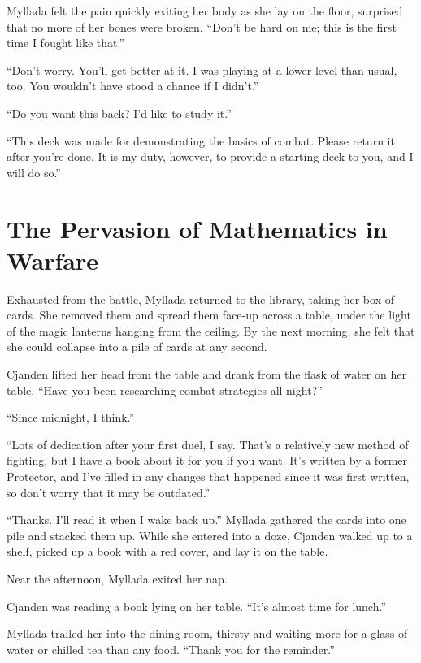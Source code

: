Myllada felt the pain quickly exiting her body as she lay on the floor, surprised that no more of her bones were broken. ``Don't be hard on me; this is the first time I fought like that.''

``Don't worry. You'll get better at it. I was playing at a lower level than usual, too. You wouldn't have stood a chance if I didn't.''

``Do you want this back? I'd like to study it.''

``This deck was made for demonstrating the basics of combat. Please return it after you're done. It is my duty, however, to provide a starting deck to you, and I will do so.''

\chapter{The Pervasion of Mathematics in Warfare}

Exhausted from the battle, Myllada returned to the library, taking her box of cards. She removed them and spread them face-up across a table, under the light of the magic lanterns hanging from the ceiling. By the next morning, she felt that she could collapse into a pile of cards at any second.

Cjanden lifted her head from the table and drank from the flask of water on her table. ``Have you been researching combat strategies all night?''

``Since midnight, I think.''

``Lots of dedication after your first duel, I say. That's a relatively new method of fighting, but I have a book about it for you if you want. It's written by a former Protector, and I've filled in any changes that happened since it was first written, so don't worry that it may be outdated.''

``Thanks. I'll read it when I wake back up.'' Myllada gathered the cards into one pile and stacked them up. While she entered into a doze, Cjanden walked up to a shelf, picked up a book with a red cover, and lay it on the table.

\centeredstars

Near the afternoon, Myllada exited her nap.

Cjanden was reading a book lying on her table. ``It's almost time for lunch.''

Myllada trailed her into the dining room, thirsty and waiting more for a glass of water or chilled tea than any food. ``Thank you for the reminder.''

